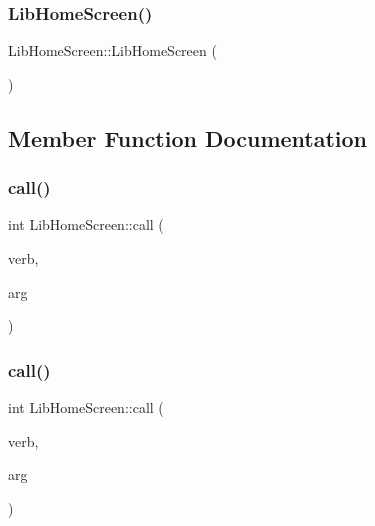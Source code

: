 \subsubsection{\texorpdfstring{Lib\+Home\+Screen()}{LibHomeScreen()}\hspace{0.1cm}{\footnotesize\ttfamily [2/2]}}
{\footnotesize\ttfamily Lib\+Home\+Screen\+::\+Lib\+Home\+Screen (\begin{DoxyParamCaption}\item[{const \hyperlink{class_lib_home_screen}{Lib\+Home\+Screen} \&}]{ }\end{DoxyParamCaption})\hspace{0.3cm}{\ttfamily [delete]}}



\subsection{Member Function Documentation}
\mbox{\label{class_lib_home_screen_a527b49dcfe581be6275d0eb2236ba37f}} 
\subsubsection{\texorpdfstring{call()}{call()}\hspace{0.1cm}{\footnotesize\ttfamily [1/2]}}
{\footnotesize\ttfamily int Lib\+Home\+Screen\+::call (\begin{DoxyParamCaption}\item[{const std\+::string \&}]{verb,  }\item[{struct json\+\_\+object $\ast$}]{arg }\end{DoxyParamCaption})}

\mbox{\label{class_lib_home_screen_ab5e8e8ab7d53e0f114e9e907fcbb7643}} 
\subsubsection{\texorpdfstring{call()}{call()}\hspace{0.1cm}{\footnotesize\ttfamily [2/2]}}
{\footnotesize\ttfamily int Lib\+Home\+Screen\+::call (\begin{DoxyParamCaption}\item[{const char $\ast$}]{verb,  }\item[{struct json\+\_\+object $\ast$}]{arg }\end{DoxyParamCaption})}


